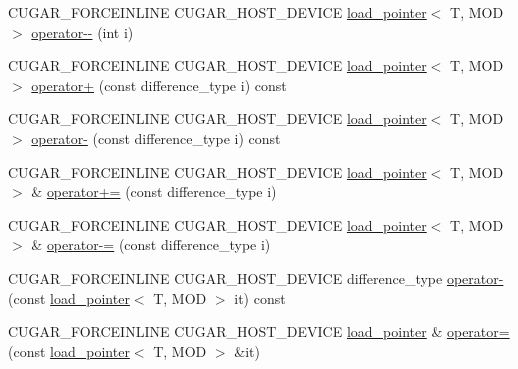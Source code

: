 \begin{DoxyCompactItemize}
\item 
C\+U\+G\+A\+R\+\_\+\+F\+O\+R\+C\+E\+I\+N\+L\+I\+NE C\+U\+G\+A\+R\+\_\+\+H\+O\+S\+T\+\_\+\+D\+E\+V\+I\+CE \hyperlink{structcugar_1_1cuda_1_1load__pointer}{load\+\_\+pointer}$<$ T, M\+OD $>$ \hyperlink{structcugar_1_1cuda_1_1load__pointer_afbac0cb3cc367c03f6f2922c330466f0}{operator-\/-\/} (int i)
\item 
C\+U\+G\+A\+R\+\_\+\+F\+O\+R\+C\+E\+I\+N\+L\+I\+NE C\+U\+G\+A\+R\+\_\+\+H\+O\+S\+T\+\_\+\+D\+E\+V\+I\+CE \hyperlink{structcugar_1_1cuda_1_1load__pointer}{load\+\_\+pointer}$<$ T, M\+OD $>$ \hyperlink{structcugar_1_1cuda_1_1load__pointer_a58594b15a0226632322e99011e19d4e0}{operator+} (const difference\+\_\+type i) const
\item 
C\+U\+G\+A\+R\+\_\+\+F\+O\+R\+C\+E\+I\+N\+L\+I\+NE C\+U\+G\+A\+R\+\_\+\+H\+O\+S\+T\+\_\+\+D\+E\+V\+I\+CE \hyperlink{structcugar_1_1cuda_1_1load__pointer}{load\+\_\+pointer}$<$ T, M\+OD $>$ \hyperlink{structcugar_1_1cuda_1_1load__pointer_ac49a87d9735d0cfa86515294c55ca378}{operator-\/} (const difference\+\_\+type i) const
\item 
C\+U\+G\+A\+R\+\_\+\+F\+O\+R\+C\+E\+I\+N\+L\+I\+NE C\+U\+G\+A\+R\+\_\+\+H\+O\+S\+T\+\_\+\+D\+E\+V\+I\+CE \hyperlink{structcugar_1_1cuda_1_1load__pointer}{load\+\_\+pointer}$<$ T, M\+OD $>$ \& \hyperlink{structcugar_1_1cuda_1_1load__pointer_ab010c8162c81964d682999df8475274c}{operator+=} (const difference\+\_\+type i)
\item 
C\+U\+G\+A\+R\+\_\+\+F\+O\+R\+C\+E\+I\+N\+L\+I\+NE C\+U\+G\+A\+R\+\_\+\+H\+O\+S\+T\+\_\+\+D\+E\+V\+I\+CE \hyperlink{structcugar_1_1cuda_1_1load__pointer}{load\+\_\+pointer}$<$ T, M\+OD $>$ \& \hyperlink{structcugar_1_1cuda_1_1load__pointer_a3f0eaa22c27c01573d432839c2210d83}{operator-\/=} (const difference\+\_\+type i)
\item 
C\+U\+G\+A\+R\+\_\+\+F\+O\+R\+C\+E\+I\+N\+L\+I\+NE C\+U\+G\+A\+R\+\_\+\+H\+O\+S\+T\+\_\+\+D\+E\+V\+I\+CE difference\+\_\+type \hyperlink{structcugar_1_1cuda_1_1load__pointer_aec49fd99699c175338bd322b9d2dc419}{operator-\/} (const \hyperlink{structcugar_1_1cuda_1_1load__pointer}{load\+\_\+pointer}$<$ T, M\+OD $>$ it) const
\item 
C\+U\+G\+A\+R\+\_\+\+F\+O\+R\+C\+E\+I\+N\+L\+I\+NE C\+U\+G\+A\+R\+\_\+\+H\+O\+S\+T\+\_\+\+D\+E\+V\+I\+CE \hyperlink{structcugar_1_1cuda_1_1load__pointer}{load\+\_\+pointer} \& \hyperlink{structcugar_1_1cuda_1_1load__pointer_a93990ba2e43e2b4843b5f480c2881e53}{operator=} (const \hyperlink{structcugar_1_1cuda_1_1load__pointer}{load\+\_\+pointer}$<$ T, M\+OD $>$ \&it)
\end{DoxyCompactItemize}
